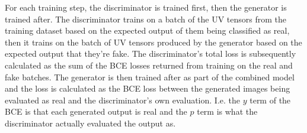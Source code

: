 \documentclass{l4proj}
\begin{document}
For each training step, the discriminator is trained first, then the generator is trained after. The discriminator trains on a batch of the UV tensors from the training dataset based on the expected output of them being classified as real, then it trains on the batch of UV tensors produced by the generator based on the expected output that they're fake. The discriminator's total loss is subsequently calculated as the sum of the BCE losses returned from training on the real and fake batches. The generator is then trained after as part of the combined model and the loss is calculated as the BCE loss between the generated images being evaluated as real and the discriminator's own evaluation. I.e. the $y$ term of the BCE is that each generated output is real and the $p$ term is what the discriminator actually evaluated the output as.
\end{document}
